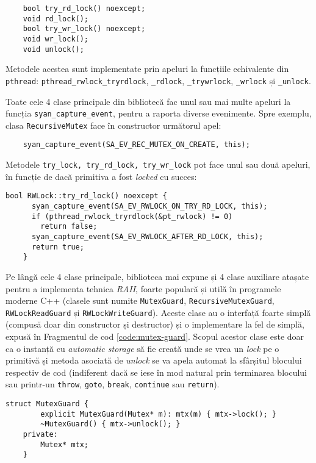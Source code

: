 \begin{lstlisting}
    bool try_rd_lock() noexcept;
    void rd_lock();
    bool try_wr_lock() noexcept;
    void wr_lock();
    void unlock();
\end{lstlisting}
Metodele acestea sunt implementate prin apeluri la funcțiile
echivalente din \lstinline{pthread}:
\lstinline{pthread_rwlock_tryrdlock}, \lstinline{_rdlock},
\lstinline{_trywrlock}, \lstinline{_wrlock} și \lstinline{_unlock}.

Toate cele 4 clase principale din bibliotecă fac unul sau mai multe
apeluri la funcția \lstinline{syan_capture_event}, pentru a raporta
diverse evenimente. Spre exemplu, clasa \lstinline{RecursiveMutex} face
în constructor următorul apel:
\begin{lstlisting}
    syan_capture_event(SA_EV_REC_MUTEX_ON_CREATE, this);
\end{lstlisting}
Metodele \lstinline{try_lock, try_rd_lock, try_wr_lock} pot face unul
sau două apeluri, în funcție de dacă primitiva a fost \textit{locked} cu
succes:
\begin{lstlisting}[caption=Metoda \lstinline{RWLock::try_rd_lock} din
                           \lstinline{cxxsync}]
    bool RWLock::try_rd_lock() noexcept {
      syan_capture_event(SA_EV_RWLOCK_ON_TRY_RD_LOCK, this);
      if (pthread_rwlock_tryrdlock(&pt_rwlock) != 0)
        return false;
      syan_capture_event(SA_EV_RWLOCK_AFTER_RD_LOCK, this);
      return true;
    }
\end{lstlisting}

Pe lângă cele 4 clase principale, biblioteca mai expune și 4 clase
auxiliare atașate pentru a implementa tehnica \textit{RAII}\cite{RAII},
foarte populară și utilă în programele moderne C++ (clasele sunt numite
\lstinline{MutexGuard}, \lstinline{RecursiveMutexGuard},
\lstinline{RWLockReadGuard} și \lstinline{RWLockWriteGuard}). Aceste
clase au o interfață foarte simplă (compusă doar din constructor și
destructor) și o implementare la fel de simplă, expusă în Fragmentul de
cod \ref{code:mutex-guard}. Scopul acestor clase este doar ca o instanță
cu \textit{automatic storage} să fie creată unde se vrea un
\textit{lock} pe o primitivă și metoda asociată de \textit{unlock} se va
apela automat la sfârșitul blocului respectiv de cod (indiferent dacă se
iese în mod natural prin terminarea blocului sau printr-un
\lstinline{throw}, \lstinline{goto}, \lstinline{break},
\lstinline{continue} sau \lstinline{return}).
\begin{lstlisting}[caption=Clasa \lstinline{MutexGuard} din
                           \lstinline{cxxsync},
                   label=code:mutex-guard]
    struct MutexGuard {
        explicit MutexGuard(Mutex* m): mtx(m) { mtx->lock(); }
        ~MutexGuard() { mtx->unlock(); }
    private:
        Mutex* mtx;
    }
\end{lstlisting}


